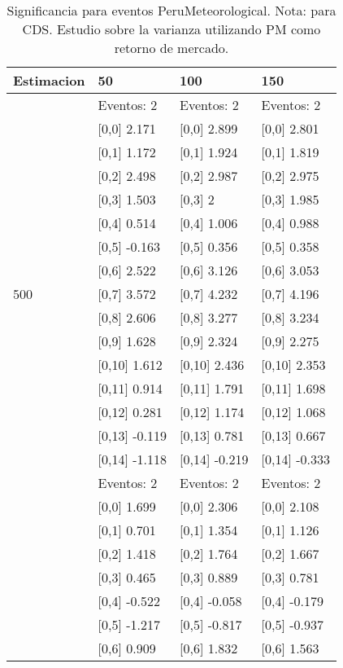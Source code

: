 \begin{table}

\caption{Significancia para eventos PeruMeteorological. Nota: para CDS. Estudio sobre la varianza utilizando PM como retorno de mercado.}
\centering
\begin{tabular}[t]{llll}
\toprule
Estimacion & 50 & 100 & 150\\
\midrule
 & Eventos:  2 & Eventos:  2 & Eventos:  2\\
 & {}[0,0] 2.171 & {}[0,0] 2.899 & {}[0,0] 2.801\\
 & {}[0,1] 1.172 & {}[0,1] 1.924 & {}[0,1] 1.819\\
 & {}[0,2] 2.498 & {}[0,2] 2.987 & {}[0,2] 2.975\\
 & {}[0,3] 1.503 & {}[0,3] 2 & {}[0,3] 1.985\\
\addlinespace
 & {}[0,4] 0.514 & {}[0,4] 1.006 & {}[0,4] 0.988\\
 & {}[0,5] -0.163 & {}[0,5] 0.356 & {}[0,5] 0.358\\
 & {}[0,6] 2.522 & {}[0,6] 3.126 & {}[0,6] 3.053\\
500 & {}[0,7] 3.572 & {}[0,7] 4.232 & {}[0,7] 4.196\\
 & {}[0,8] 2.606 & {}[0,8] 3.277 & {}[0,8] 3.234\\
\addlinespace
 & {}[0,9] 1.628 & {}[0,9] 2.324 & {}[0,9] 2.275\\
 & {}[0,10] 1.612 & {}[0,10] 2.436 & {}[0,10] 2.353\\
 & {}[0,11] 0.914 & {}[0,11] 1.791 & {}[0,11] 1.698\\
 & {}[0,12] 0.281 & {}[0,12] 1.174 & {}[0,12] 1.068\\
 & {}[0,13] -0.119 & {}[0,13] 0.781 & {}[0,13] 0.667\\
\addlinespace
 & {}[0,14] -1.118 & {}[0,14] -0.219 & {}[0,14] -0.333\\
 & Eventos:  2 & Eventos:  2 & Eventos:  2\\
 & {}[0,0] 1.699 & {}[0,0] 2.306 & {}[0,0] 2.108\\
 & {}[0,1] 0.701 & {}[0,1] 1.354 & {}[0,1] 1.126\\
 & {}[0,2] 1.418 & {}[0,2] 1.764 & {}[0,2] 1.667\\
\addlinespace
 & {}[0,3] 0.465 & {}[0,3] 0.889 & {}[0,3] 0.781\\
 & {}[0,4] -0.522 & {}[0,4] -0.058 & {}[0,4] -0.179\\
 & {}[0,5] -1.217 & {}[0,5] -0.817 & {}[0,5] -0.937\\
 & {}[0,6] 0.909 & {}[0,6] 1.832 & {}[0,6] 1.563\\

\end{tabular}
\end{table}
